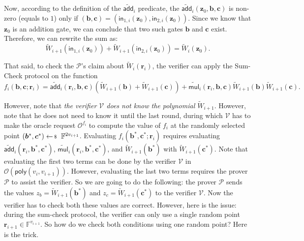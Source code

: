 \documentclass[../../book.tex]{subfiles}
\begin{document}
Now, according to the definition of the $\widetilde{\mathsf{add}}_i$ predicate,
the $\widetilde{\mathsf{add}}_i(\mathbf{z}_0,\boldsymbol{b},\boldsymbol{c})$ is
non-zero (equals to $1$) only if $(\boldsymbol{b}, \boldsymbol{c}) =
(\mathsf{in}_{1,i}(\mathbf{z}_0), \mathsf{in}_{2,i}(\mathbf{z}_0))$. Since we
know that $\mathbf{z}_0$ is an addition gate, we can conclude that two such
gates $\boldsymbol{b}$ and $\boldsymbol{c}$ exist. Therefore, we can rewrite the
sum as:
\begin{equation*}
    \widetilde{W}_{i+1}(\mathsf{in}_{1,i}(\mathbf{z}_0)) + \widetilde{W}_{i+1}(\mathsf{in}_{2,i}(\mathbf{z}_0)) = \widetilde{W}_i(\mathbf{z}_0).
\end{equation*}

That said, to check the $\mathcal{P}$'s claim about $\widetilde{W}_i(\mathbf{r}_i)$, the verifier 
can apply the Sum-Check protocol on the function
\begin{equation*}
    f_i(\boldsymbol{b}, \boldsymbol{c}; \mathbf{r}_i) = \widetilde{\mathsf{add}}_i(\mathbf{r}_i, \boldsymbol{b}, \boldsymbol{c})(\widetilde{W}_{i+1}(\boldsymbol{b}) + \widetilde{W}_{i+1}(\boldsymbol{c})) + \widetilde{\mathsf{mul}}_i(\mathbf{r}_i, \boldsymbol{b}, \boldsymbol{c})\widetilde{W}_{i+1}(\boldsymbol{b})\widetilde{W}_{i+1}(\boldsymbol{c}).
\end{equation*}

However, note that \textit{the verifier $\mathcal{V}$ does not know the
polynomial $\widetilde{W}_{i+1}$}. However, note that he does not need to know
it until the last round, during which $\mathcal{V}$ has to make the oracle
request $\mathcal{O}^{f_i}$ to compute the value of $f_i$ at the randomly
selected point $(\boldsymbol{b}^*, \boldsymbol{c}^*) \leftarrowS
\mathbb{F}^{2v_{i+1}}$. Evaluating $f_i(\boldsymbol{b}^*, \boldsymbol{c}^*;
\mathbf{r}_i)$ requires evaluating
$\widetilde{\mathsf{add}}_i(\mathbf{r}_i,\boldsymbol{b}^*,\boldsymbol{c}^*)$,
$\widetilde{\mathsf{mul}}_i(\mathbf{r}_i,\boldsymbol{b}^*,\boldsymbol{c}^*)$,
and $\widetilde{W}_{i+1}(\boldsymbol{b}^*)$ with
$\widetilde{W}_{i+1}(\boldsymbol{c}^*)$. Note that evaluating the first two
terms can be done by the verifier $\mathcal{V}$ in
$\mathcal{O}(\mathsf{poly}(v_i,v_{i+1}))$. However, evaluating the last two
terms requires the prover $\mathcal{P}$ to assist the verifier. So we are going
to do the following: the prover $\mathcal{P}$ sends the values
$z_b=\widetilde{W}_{i+1}(\boldsymbol{b}^*)$ and
$z_c=\widetilde{W}_{i+1}(\boldsymbol{c}^*)$ to the verifier $\mathcal{V}$. Now
the verifier has to check both these values are correct. However, here is the
issue: during the sum-check protocol, the verifier can only use a single random
point $\mathbf{r}_{i+1} \in \mathbb{F}^{v_{i+1}}$. So how do we check both 
conditions using one random point? Here is the trick.
\end{document}
